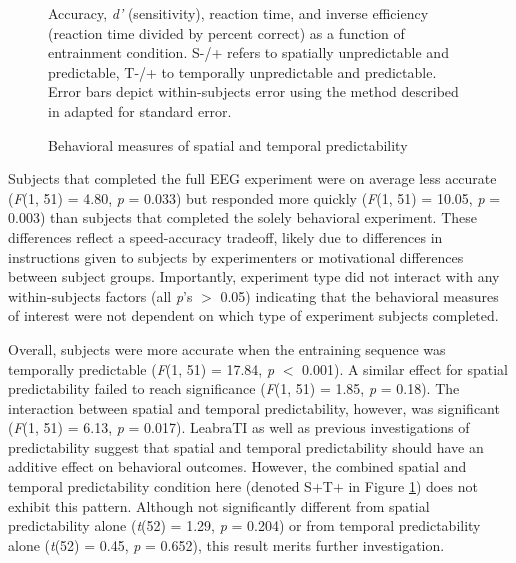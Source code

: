\documentclass[dwyatte_dissertation.tex]{subfiles}
\begin{document}
\begin{figure}[h!]
\begin{center}
\begin{tabular}{ll}
\end{tabular}
\end{center}
\caption{Behavioral measures of spatial and temporal predictability}{Accuracy, \textit{d'} (sensitivity), reaction time, and inverse efficiency (reaction time divided by percent correct) as a function of entrainment condition. S-/+ refers to spatially unpredictable and predictable, T-/+ to temporally unpredictable and predictable. Error bars depict within-subjects error using the method described in \protect{} adapted for standard error.}
\label{fig:behave}
\end{figure}

Subjects that completed the full EEG experiment were on average less accurate (\textit{F}(1, 51) = 4.80, \textit{p} = 0.033) but responded more quickly (\textit{F}(1, 51) = 10.05, \textit{p} = 0.003) than subjects that completed the solely behavioral experiment. These differences reflect a speed-accuracy tradeoff, likely due to differences in instructions given to subjects by experimenters or motivational differences between subject groups. Importantly, experiment type did not interact with any within-subjects factors (all \textit{p}'s $>$ 0.05) indicating that the behavioral measures of interest were not dependent on which type of experiment subjects completed.

Overall, subjects were more accurate when the entraining sequence was temporally predictable (\textit{F}(1, 51) = 17.84, \textit{p} $<$ 0.001). A similar effect for spatial predictability failed to reach significance (\textit{F}(1, 51) = 1.85, \textit{p} = 0.18). The interaction between spatial and temporal predictability, however, was significant (\textit{F}(1, 51) = 6.13, \textit{p} = 0.017). LeabraTI as well as previous investigations of predictability \cite[e.g.,]{DohertyRaoMesulamEtAl05} suggest that spatial and temporal predictability should have an additive effect on behavioral outcomes. However, the combined spatial and temporal predictability condition here (denoted S+T+ in Figure \ref{fig:behave}) does not exhibit this pattern. Although not significantly different from spatial predictability alone (\textit{t}(52) = 1.29, \textit{p} = 0.204) or from temporal predictability alone (\textit{t}(52) = 0.45, \textit{p} = 0.652), this result merits further investigation. 
\end{document}
